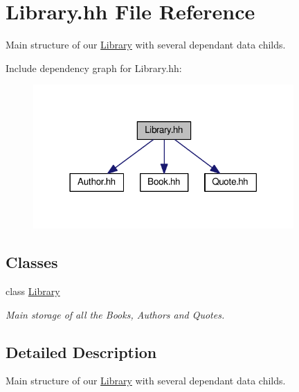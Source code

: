 \hypertarget{_library_8hh}{}\section{Library.\+hh File Reference}
\label{_library_8hh}


Main structure of our \hyperlink{class_library}{Library} with several dependant data childs.  


Include dependency graph for Library.\+hh\+:
\nopagebreak
\begin{figure}[H]
\begin{center}
\leavevmode
\includegraphics[width=282pt]{_library_8hh__incl}
\end{center}
\end{figure}
\subsection*{Classes}
\begin{DoxyCompactItemize}
\item 
class \hyperlink{class_library}{Library}
\begin{DoxyCompactList}\small\item\em Main storage of all the Books, Authors and Quotes. \end{DoxyCompactList}\end{DoxyCompactItemize}


\subsection{Detailed Description}
Main structure of our \hyperlink{class_library}{Library} with several dependant data childs. 

